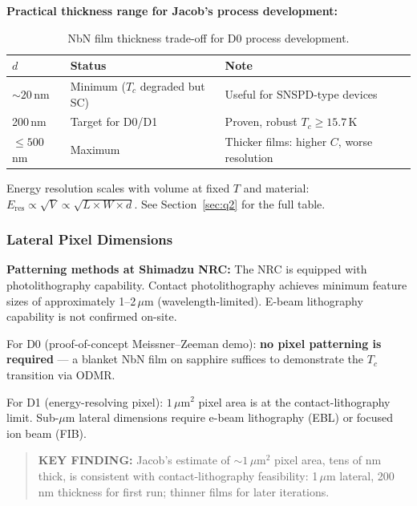 \textbf{Practical thickness range for Jacob's process development:}

\begin{table}[ht]
\centering
\caption{NbN film thickness trade-off for D0 process development.}
\label{tab:q1_thickness}
\small
\begin{tabular}{@{}lll@{}}
\toprule
$d$ & Status & Note \\
\midrule
$\sim\!20$\,nm & Minimum ($T_c$ degraded but SC) & Useful for SNSPD-type devices \\
200\,nm & Target for D0/D1 & Proven, robust $T_c \geq 15.7$\,K \\
$\leq 500$\,nm & Maximum & Thicker films: higher $C$, worse resolution \\
\bottomrule
\end{tabular}
\end{table}

\noindent Energy resolution scales with volume at fixed $T$ and material:
$E_\mathrm{res} \propto \sqrt{V} \propto \sqrt{L \times W \times d}$. %
See Section~\ref{sec:q2} for the full table.

\subsubsection{Lateral Pixel Dimensions}
\label{sec:q1_lateral}

\textbf{Patterning methods at Shimadzu NRC:}
The NRC is equipped with photolithography capability. Contact photolithography
achieves minimum feature sizes of approximately 1--2\,$\mu$m (wavelength-limited).
E-beam lithography capability is not confirmed on-site.

For D0 (proof-of-concept Meissner--Zeeman demo): \textbf{no pixel patterning is
required} --- a blanket NbN film on sapphire suffices to demonstrate the $T_c$
transition via ODMR.

For D1 (energy-resolving pixel): $1\,\mu$m$^2$ pixel area is at the
contact-lithography limit. Sub-$\mu$m lateral dimensions require e-beam
lithography (EBL) or focused ion beam (FIB).

\begin{quote}
\textbf{KEY FINDING:}
Jacob's estimate of $\sim\!1\,\mu$m$^2$ pixel area, tens of nm thick, is
consistent with contact-lithography feasibility: 1\,$\mu$m lateral,
200\,nm thickness for first run; thinner films for later iterations.
\end{quote}

